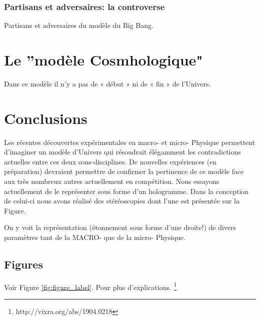\documentclass{article}
\begin{document}
\subsubsection{Partisans et adversaires: la controverse}

Partisans et adversaires du modèle du Big Bang.

\section{Le ”modèle Cosmhologique"}
\label{sec:headings}

Dans ce modèle il n'y a pas de « début » ni de « fin » de l'Univers.


\section{Conclusions}
\label{sec:headings}

Les récentes découvertes expérimentales en macro- et micro- Physique permettent d'imaginer un modèle d'Univers qui résoudrait élégamment les contradictions actuelles entre ces deux sous-disciplines. De nouvelles expériences (en préparation) devraient permettre de confirmer la pertinence de ce modèle face aux très nombreux autres actuellement en compétition. Nous essayons actuellement de le représenter sous forme d'un hologramme. Dans la conception de celui-ci nous avons réalisé des stéréoscopies dont l'une est présentée sur la Figure.

On y voit la représentation (étonnement sous forme d'une droite!) de divers paramètres tant de la MACRO- que de la micro- Physique.


\subsection{Figures}

Voir Figure \ref{fig:figure_label}. Pour plus d'explications. \footnote{http://vixra.org/abs/1904.0218}
 
\end{document}
